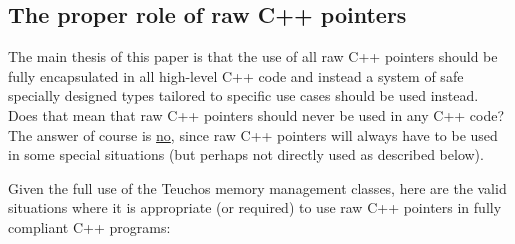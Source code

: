 \documentclass[pdf,ps2pdf,11pt]{SANDreport}
\begin{document}
%
{}\subsection{The proper role of raw C++ pointers}
\label{sec:role-of-raw-pointers}
%

The main thesis of this paper is that the use of all raw C++ pointers
should be fully encapsulated in all high-level C++ code and instead a
system of safe specially designed types tailored to specific use cases
should be used instead.  Does that mean that raw C++ pointers should
never be used in any C++ code?  The answer of course is
{}\underline{no}, since raw C++ pointers will always have to be used
in some special situations (but perhaps not directly used as described
below).

Given the full use of the Teuchos memory management classes, here are
the valid situations where it is appropriate (or required) to use raw
C++ pointers in fully compliant C++ programs:
\end{document}
